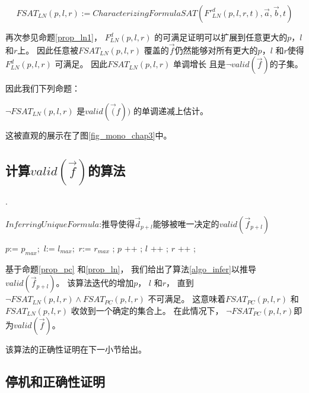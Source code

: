 \begin{equation}\label{fsat_ln}
FSAT_{LN}(p,l,r):=CharacterizingFormulaSAT(F'^d_{LN}(p,l,r,t),\vec{a},\vec{b},t)
\end{equation}

再次参见命题\ref{prop_ln1}，
$F^d_{LN}(p,l,r)$ 的可满足证明可以扩展到任意更大的$p$，$l$ 和$r$上。
因此任意被$FSAT_{LN}(p,l,r)$ 覆盖的$\vec{f}$仍然能够对所有更大的$p$，$l$ 和$r$使得$F^d_{LN}(p,l,r)$ 可满足。
因此$FSAT_{LN}(p,l,r)$ 单调增长
且是$\neg valid(\vec{f})$的子集。

因此我们下列命题：

\begin{proposition}\label{prop_ln}
$\neg FSAT_{LN}(p,l,r)$ 是$valid(\vec(f))$ 的单调递减上估计。
\end{proposition}

这被直观的展示在了图\ref{fig_mono_chap3}中。


\subsection{计算$valid(\vec{f})$的算法}\label{subsub_overal}.

\begin{algorithm}[t]
\caption{$InferringUniqueFormula$:推导使得$\vec{d}_{p+l}$能够被唯一决定的$valid(\vec{f}_{p+l})$}
\label{algo_infer}
\begin{algorithmic}[1]
\STATE $p$:= $p_{max}$;~$l$:= $l_{max}$;~$r$:= $r_{max}$ ;
  \STATE $p$ ++ ;
  \STATE $l$ ++ ;
  \STATE $r$ ++ ;
\ENDWHILE
{}
\end{algorithmic}
\end{algorithm}

基于命题\ref{prop_pc} 和\ref{prop_ln}，
我们给出了算法\ref{algo_infer}以推导$valid(\vec{f}_{p+l})$。
该算法迭代的增加$p$， $l$ 和$r$，
直到$\neg FSAT_{LN}(p,l,r)\wedge FSAT_{PC}(p,l,r)$ 不可满足。
这意味着$FSAT_{PC}(p,l,r)$ 和$FSAT_{LN}(p,l,r)$ 收敛到一个确定的集合上。
在此情况下，
$\neg FSAT_{PC}(p,l,r)$即为$valid(\vec{f})$。

该算法的正确性证明在下一小节给出。

\subsection{停机和正确性证明}\label{subsec_proofterm}


